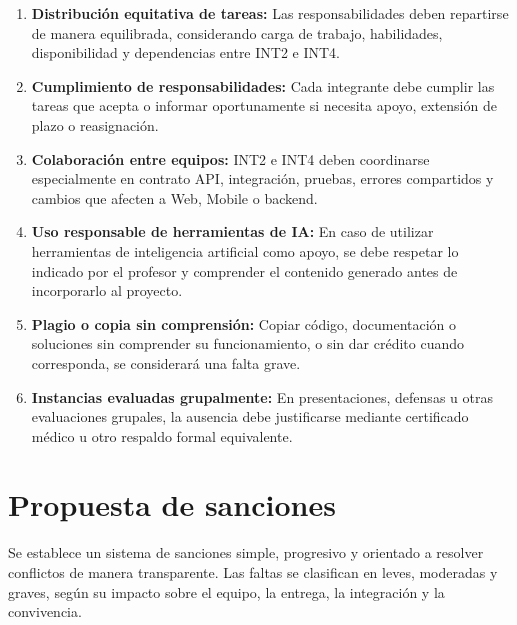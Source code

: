 \documentclass[12pt,a4paper]{article}
\begin{document}
\begin{enumerate}
    \item \textbf{Distribución equitativa de tareas:} Las responsabilidades deben repartirse de manera equilibrada, considerando carga de trabajo, habilidades, disponibilidad y dependencias entre INT2 e INT4.

    \item \textbf{Cumplimiento de responsabilidades:} Cada integrante debe cumplir las tareas que acepta o informar oportunamente si necesita apoyo, extensión de plazo o reasignación.

    \item \textbf{Colaboración entre equipos:} INT2 e INT4 deben coordinarse especialmente en contrato API, integración, pruebas, errores compartidos y cambios que afecten a Web, Mobile o backend.

    \item \textbf{Uso responsable de herramientas de IA:} En caso de utilizar herramientas de inteligencia artificial como apoyo, se debe respetar lo indicado por el profesor y comprender el contenido generado antes de incorporarlo al proyecto.

    \item \textbf{Plagio o copia sin comprensión:} Copiar código, documentación o soluciones sin comprender su funcionamiento, o sin dar crédito cuando corresponda, se considerará una falta grave.

    \item \textbf{Instancias evaluadas grupalmente:} En presentaciones, defensas u otras evaluaciones grupales, la ausencia debe justificarse mediante certificado médico u otro respaldo formal equivalente.
\end{enumerate}

\section{Propuesta de sanciones}

Se establece un sistema de sanciones simple, progresivo y orientado a resolver conflictos de manera transparente. Las faltas se clasifican en leves, moderadas y graves, según su impacto sobre el equipo, la entrega, la integración y la convivencia.
\end{document}
